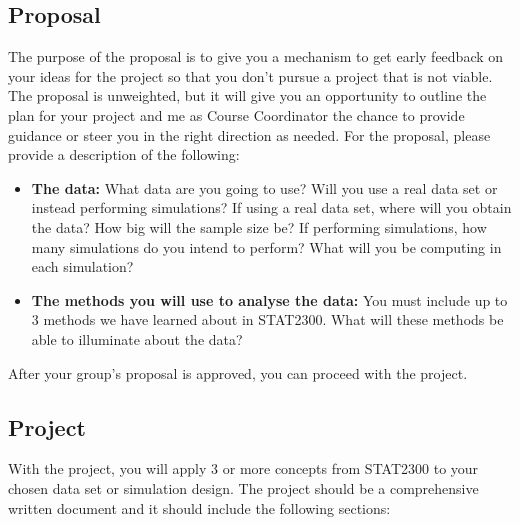 \documentclass[10pt]{article}
\begin{document}
\subsection*{Proposal}

The purpose of the proposal is to give you a mechanism to get early feedback on your ideas for the project so that you don't pursue a project that is not viable. The proposal is unweighted, but it will give you an opportunity to outline the plan for your project and me as Course Coordinator the chance to provide guidance or steer you in the right direction as needed. For the proposal, please provide a description of the following:

\begin{itemize}
    \item \textbf{The data:} What data are you going to use? Will you use a real data set or instead performing simulations? If using a real data set, where will you obtain the data? How big will the sample size be? If performing simulations, how many simulations do you intend to perform? What will you be computing in each simulation?
    \item \textbf{The methods you will use to analyse the data:} You must include up to 3 methods we have learned about in STAT2300. What will these methods be able to illuminate about the data?
\end{itemize}

After your group's proposal is approved, you can proceed with the project.

\subsection*{Project}

With the project, you will apply 3 or more concepts from STAT2300 to your chosen data set or simulation design. The project should be a comprehensive written document and it should include the following sections:
\end{document}
